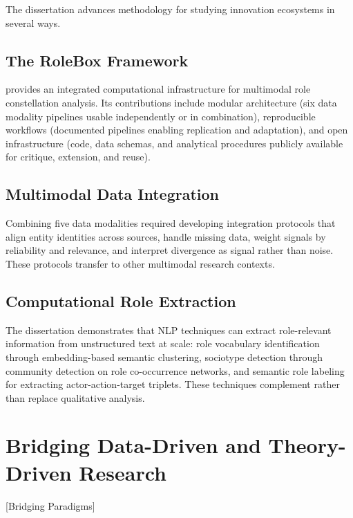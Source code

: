 \documentclass[../main.tex]{subfiles}
\begin{document}
The dissertation advances methodology for studying innovation ecosystems in several ways.

\subsection{The RoleBox Framework}

\RoleBox{} provides an integrated computational infrastructure for multimodal role constellation analysis. Its contributions include modular architecture (six data modality pipelines usable independently or in combination), reproducible workflows (documented pipelines enabling replication and adaptation), and open infrastructure (code, data schemas, and analytical procedures publicly available for critique, extension, and reuse).

\subsection{Multimodal Data Integration}

Combining five data modalities required developing integration protocols that align entity identities across sources, handle missing data, weight signals by reliability and relevance, and interpret divergence as signal rather than noise. These protocols transfer to other multimodal research contexts.

\subsection{Computational Role Extraction}

The dissertation demonstrates that NLP techniques can extract role-relevant information from unstructured text at scale: role vocabulary identification through embedding-based semantic clustering, sociotype detection through community detection on role co-occurrence networks, and semantic role labeling for extracting actor-action-target triplets. These techniques complement rather than replace qualitative analysis.


\section{Bridging Data-Driven and Theory-Driven Research}[Bridging Paradigms]
\end{document}
